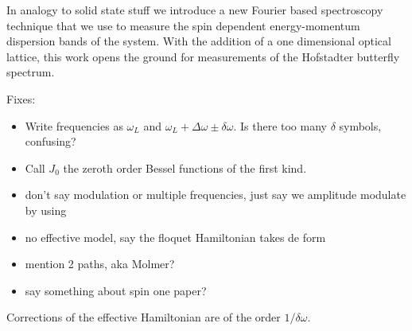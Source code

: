 


In analogy to solid state stuff we introduce a new Fourier based spectroscopy technique that we use to measure the spin dependent energy-momentum dispersion bands of the system. With the addition of a one dimensional optical lattice, this work opens the ground for measurements of the Hofstadter butterfly spectrum. 




Fixes:
\begin{itemize}
	\item Write frequencies as $\omega_L$ and $\omega_L +\Delta\omega \pm\delta\omega$. Is there too many $\delta$ symbols, confusing?
	\item Call $J_0$ the zeroth order Bessel functions of the first kind.
	\item don't say modulation or multiple frequencies, just say we amplitude modulate by using 
	\item no effective model, say the floquet Hamiltonian takes de form
	\item mention 2 paths, aka Molmer?
	\item say something about spin one paper?
\end{itemize}




Corrections of the effective Hamiltonian are of the order $1/\delta\omega$.
